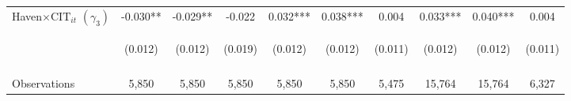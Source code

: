 \begin{center}
\begin{tabular}{lccccccccc}
Haven$\times\text{CIT}_{it}$ $ (\gamma_3)$ & -0.030** & -0.029** & -0.022 & 0.032*** & 0.038*** & 0.004 & 0.033*** & 0.040*** & 0.004 \\
 & \begin{footnotesize}(0.012)\end{footnotesize} & \begin{footnotesize}(0.012)\end{footnotesize} & \begin{footnotesize}(0.019)\end{footnotesize} & \begin{footnotesize}(0.012)\end{footnotesize} & \begin{footnotesize}(0.012)\end{footnotesize} & \begin{footnotesize}(0.011)\end{footnotesize} & \begin{footnotesize}(0.012)\end{footnotesize} & \begin{footnotesize}(0.012)\end{footnotesize} & \begin{footnotesize}(0.011)\end{footnotesize} \\
\vspace{4pt} & \begin{footnotesize}\end{footnotesize} & \begin{footnotesize}\end{footnotesize} & \begin{footnotesize}\end{footnotesize} & \begin{footnotesize}\end{footnotesize} & \begin{footnotesize}\end{footnotesize} & \begin{footnotesize}\end{footnotesize} & \begin{footnotesize}\end{footnotesize} & \begin{footnotesize}\end{footnotesize} & \begin{footnotesize}\end{footnotesize} \\
Observations & 5,850 & 5,850 & 5,850 & 5,850 & 5,850 & 5,475 & 15,764 & 15,764 & 6,327 \\

\end{tabular}
\end{center}
